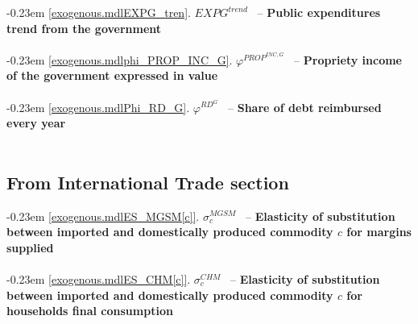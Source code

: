 \documentclass[12pt]{article}
\numberwithin{equation}{section}
\begin{document}
\noindent \kern-0.23em \noindent \begingroup {} \label{exogenous.mdlEXPG_tren}\ref{exogenous.mdlEXPG_tren}.
         
        \ensuremath{EXPG^{trend}}~ \endgroup -- \noindent \textbf{Public expenditures trend from the government}  \\ \\[-8pt]


\noindent \kern-0.23em \noindent \begingroup {} \label{exogenous.mdlphi_PROP_INC_G}\ref{exogenous.mdlphi_PROP_INC_G}.
         
        \ensuremath{\varphi^{PROP^{INC,G}}}~ \endgroup -- \noindent \textbf{Propriety income of the government expressed in value}  \\ \\[-8pt]


\noindent \kern-0.23em \noindent \begingroup {} \label{exogenous.mdlPhi_RD_G}\ref{exogenous.mdlPhi_RD_G}.
         
        \ensuremath{\varphi^{RD^{G}}}~ \endgroup -- \noindent \textbf{Share of debt reimbursed every year}  \\ \\[-8pt]












\subsection{From International Trade section}




\noindent \kern-0.23em \noindent \begingroup {} \label{exogenous.mdlES_MGSM[c]}\ref{exogenous.mdlES_MGSM[c]}.
         
        \ensuremath{\sigma^{MGSM}_{c}}~ \endgroup -- \noindent \textbf{Elasticity of substitution between imported and domestically produced commodity $c$ for margins supplied}  \\ \\[-8pt]


\noindent \kern-0.23em \noindent \begingroup {} \label{exogenous.mdlES_CHM[c]}\ref{exogenous.mdlES_CHM[c]}.
         
        \ensuremath{\sigma^{CHM}_{c}}~ \endgroup -- \noindent \textbf{Elasticity of substitution between imported and domestically produced commodity $c$ for households final consumption}  \\ \\[-8pt]
\end{document}
